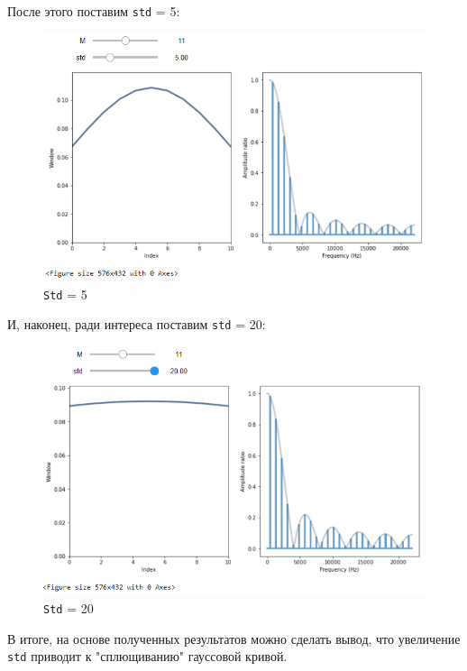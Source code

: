 \documentclass[a4paper]{article}
\begin{document}
            После этого поставим \texttt{std} = 5:
            
            \begin{figure}[H]
                \centering
                \includegraphics[width=\textwidth]{ex_1_std_5.png}
                \caption{\texttt{Std} = 5}
                \label{fig:ex_1_std_5}
            \end{figure}
            
            И, наконец, ради интереса поставим \texttt{std} = 20:
            
            \begin{figure}[H]
                \centering
                \includegraphics[width=\textwidth]{ex_1_std_20.png}
                \caption{\texttt{Std} = 20}
                \label{fig:ex_1_std_20}
            \end{figure}
            
            В итоге, на основе полученных результатов можно сделать вывод, что увеличение \texttt{std} приводит к "сплющиванию"  гауссовой кривой. 
            
\end{document}
